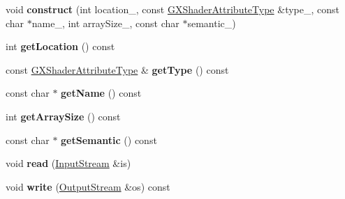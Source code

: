 \begin{DoxyCompactItemize}
\item 
void {\bfseries construct} (int location\+\_\+, const \hyperlink{class_i_dream_sky_1_1_g_x_shader_attribute_type}{G\+X\+Shader\+Attribute\+Type} \&type\+\_\+, const char $\ast$name\+\_\+, int array\+Size\+\_\+, const char $\ast$semantic\+\_\+)\hypertarget{class_i_dream_sky_1_1_g_x_attribute_a53622feb4b2c5e2f42b94beeba60a16b}{}\label{class_i_dream_sky_1_1_g_x_attribute_a53622feb4b2c5e2f42b94beeba60a16b}

\item 
int {\bfseries get\+Location} () const \hypertarget{class_i_dream_sky_1_1_g_x_attribute_a2115f264e9eed1e82b5ee0506b2d796f}{}\label{class_i_dream_sky_1_1_g_x_attribute_a2115f264e9eed1e82b5ee0506b2d796f}

\item 
const \hyperlink{class_i_dream_sky_1_1_g_x_shader_attribute_type}{G\+X\+Shader\+Attribute\+Type} \& {\bfseries get\+Type} () const \hypertarget{class_i_dream_sky_1_1_g_x_attribute_ad5ad510c9dbf596b851dd5b268dd569e}{}\label{class_i_dream_sky_1_1_g_x_attribute_ad5ad510c9dbf596b851dd5b268dd569e}

\item 
const char $\ast$ {\bfseries get\+Name} () const \hypertarget{class_i_dream_sky_1_1_g_x_attribute_a3925e4629e42bc47e1451ab1019b4caf}{}\label{class_i_dream_sky_1_1_g_x_attribute_a3925e4629e42bc47e1451ab1019b4caf}

\item 
int {\bfseries get\+Array\+Size} () const \hypertarget{class_i_dream_sky_1_1_g_x_attribute_a77e9c24f826838e2667468f03959d40f}{}\label{class_i_dream_sky_1_1_g_x_attribute_a77e9c24f826838e2667468f03959d40f}

\item 
const char $\ast$ {\bfseries get\+Semantic} () const \hypertarget{class_i_dream_sky_1_1_g_x_attribute_a5cdaccde8ec9ae327e0dd4354e7fe5b2}{}\label{class_i_dream_sky_1_1_g_x_attribute_a5cdaccde8ec9ae327e0dd4354e7fe5b2}

\item 
void {\bfseries read} (\hyperlink{class_i_dream_sky_1_1_input_stream}{Input\+Stream} \&is)\hypertarget{class_i_dream_sky_1_1_g_x_attribute_a066b1e38bc3e4b983f1a04e5b30a5ae4}{}\label{class_i_dream_sky_1_1_g_x_attribute_a066b1e38bc3e4b983f1a04e5b30a5ae4}

\item 
void {\bfseries write} (\hyperlink{class_i_dream_sky_1_1_output_stream}{Output\+Stream} \&os) const \hypertarget{class_i_dream_sky_1_1_g_x_attribute_a2aff07dee1defab3b806ee36301b403e}{}\label{class_i_dream_sky_1_1_g_x_attribute_a2aff07dee1defab3b806ee36301b403e}

\end{DoxyCompactItemize}
